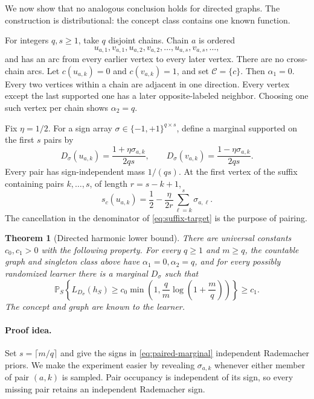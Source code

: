 \documentclass{article}
\newtheorem{theorem}{Theorem}
\newcommand{\Pp}{\mathbb P}
\newcommand{\1}{\mathbf 1}
\begin{document}
We now show that no analogous conclusion holds for directed graphs. The construction is distributional: the concept class contains one known function.

For integers $q,s\ge1$, take $q$ disjoint chains. Chain $a$ is ordered \[ u_{a,1},v_{a,1},u_{a,2},v_{a,2},\ldots,u_{a,s},v_{a,s},\ldots, \] and has an arc from every earlier vertex to every later vertex. There are no cross-chain arcs. Let $c(u_{a,k})=0$ and $c(v_{a,k})=1$, and set $\mathcal C=\{c\}$. Then $\alpha_1=0$. Every two vertices within a chain are adjacent in one direction. Every vertex except the last supported one has a later opposite-labeled neighbor. Choosing one such vertex per chain shows $\alpha_2=q$.

Fix $\eta=1/2$. For a sign array $\sigma\in\{-1,+1\}^{q\times s}$, define a marginal supported on the first $s$ pairs by
\begin{equation}
 D_\sigma(u_{a,k})=\frac{1+\eta\sigma_{a,k}}{2qs},\qquad
 D_\sigma(v_{a,k})=\frac{1-\eta\sigma_{a,k}}{2qs}.
 \label{eq:paired-marginal}
\end{equation}
Every pair has sign-independent mass $1/(qs)$. At the first vertex of the suffix containing pairs $k,\ldots,s$, of length $r=s-k+1$,
\begin{equation}
 s_c(u_{a,k})=\frac12-\frac{\eta}{2r}\sum_{\ell=k}^s\sigma_{a,\ell}.
 \label{eq:suffix-target}
\end{equation}
The cancellation in the denominator of \eqref{eq:suffix-target} is the purpose of pairing.

\begin{theorem}[Directed harmonic lower bound]\label{thm:directed-lower}
There are universal constants $c_0,c_1>0$ with the following property. For every $q\ge1$ and $m\ge q$, the countable graph and singleton class above have $\alpha_1=0,\alpha_2=q$, and for every possibly randomized learner there is a marginal $D_\sigma$ such that
\begin{equation}
 \Pp_S\!\left\{L_{D_\sigma}(h_S)
 \ge c_0\min\!\left(1,\frac{q}{m}\log\!\left(1+\frac mq\right)\right)\right\}
 \ge c_1.
 \label{eq:directed-lower}
\end{equation}
The concept and graph are known to the learner.
\end{theorem}

\paragraph{Proof idea.}
Set $s=\lceil m/q\rceil$ and give the signs in \eqref{eq:paired-marginal} independent Rademacher priors. We make the experiment easier by revealing $\sigma_{a,k}$ whenever either member of pair $(a,k)$ is sampled. Pair occupancy is independent of its sign, so every missing pair retains an independent Rademacher sign.
\end{document}
